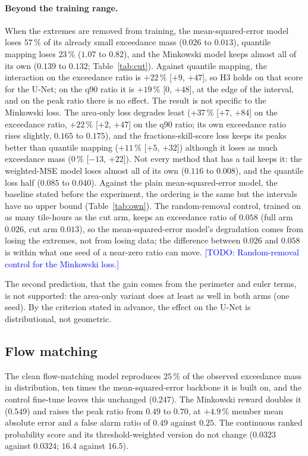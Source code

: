 \documentclass{article}
\newcommand{\todo}[1]{\textcolor{blue}{[TODO: #1]}}
\begin{document}
\paragraph{Beyond the training range.} When the extremes are removed from training, the mean-squared-error model loses
$57\,\%$ of its already small exceedance mass ($0.026$ to $0.013$), quantile mapping loses $23\,\%$ ($1.07$ to $0.82$),
and the Minkowski model keeps almost all of its own ($0.139$ to $0.132$; Table~\ref{tab:cut}). Against quantile mapping,
the interaction on the exceedance ratio is $+22\,\%$ [$+9$, $+47$], so H3 holds on that score for the U-Net; on the q90
ratio it is $+19\,\%$ [$0$, $+48$], at the edge of the interval, and on the peak ratio there is no effect. The result is
not specific to the Minkowski loss. The area-only loss degrades least ($+37\,\%$ [$+7$, $+84$] on the exceedance ratio,
$+22\,\%$ [$+2$, $+47$] on the q90 ratio; its own exceedance ratio rises slightly, $0.165$ to $0.175$), and the
fractions-skill-score loss keeps its peaks better than quantile mapping ($+11\,\%$ [$+5$, $+32$]) although it loses as
much exceedance mass ($0\,\%$ [$-13$, $+22$]). Not every method that has a tail keeps it: the weighted-MSE model loses
almost all of its own ($0.116$ to $0.008$), and the quantile loss half ($0.085$ to $0.040$). Against the plain
mean-squared-error model, the baseline stated before the experiment, the ordering is the same but the intervals have no
upper bound (Table~\ref{tab:own}).
The random-removal control, trained on as many tile-hours as the cut arm, keeps an exceedance ratio of $0.058$
(full arm $0.026$, cut arm $0.013$), so the mean-squared-error model's degradation comes from losing the extremes,
not from losing data; the difference between $0.026$ and $0.058$ is within what one seed of a near-zero ratio can
move. \todo{Random-removal control for the Minkowski loss.}

The second prediction, that the gain comes from the perimeter and euler terms, is not supported: the area-only
variant does at least as well in both arms (one seed). By the criterion stated in advance, the effect on the U-Net is
distributional, not geometric.

\subsection{Flow matching}
The clean flow-matching model reproduces $25\,\%$ of the observed exceedance mass in distribution, ten times the
mean-squared-error backbone it is built on, and the control fine-tune leaves this unchanged ($0.247$). The Minkowski
reward doubles it ($0.549$) and raises the peak ratio from $0.49$ to $0.70$, at $+4.9\,\%$ member mean absolute error
and a false alarm ratio of $0.49$ against $0.25$. The continuous ranked probability score and its threshold-weighted
version do not change ($0.0323$ against $0.0324$; $16.4$ against $16.5$).
\end{document}

